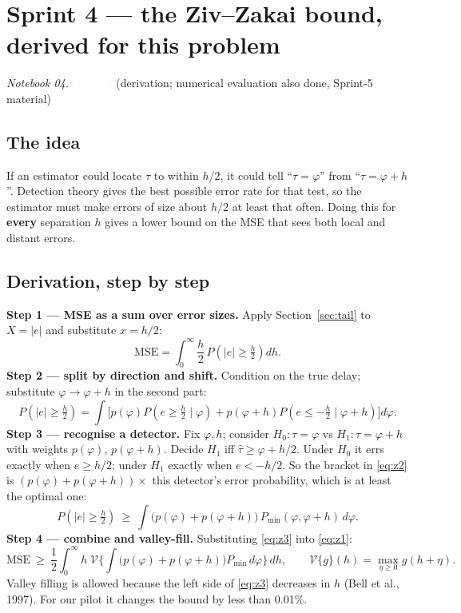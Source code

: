 \documentclass[11pt,a4paper]{article}
\newcommand{\done}{\colorbox{okgreen}{\textcolor{white}{\scriptsize\bfseries DONE}}}
\newcommand{\VF}{\mathcal{V}}
\begin{document}
\section{Sprint 4 --- the Ziv--Zakai bound, derived for this problem}\label{sec:zzb}
\textit{Notebook 04.} \done\ (derivation; numerical evaluation also done, Sprint-5 material)

\subsection{The idea}
If an estimator could locate $\tau$ to within $h/2$, it could tell ``$\tau=\varphi$'' from ``$\tau=\varphi+h$''. Detection
theory gives the best possible error rate for that test, so the estimator must make errors of size about $h/2$ at least that
often. Doing this for \textbf{every} separation $h$ gives a lower bound on the MSE that sees both local and distant errors.

\subsection{Derivation, step by step}
\textbf{Step 1 --- MSE as a sum over error sizes.} Apply Section~\ref{sec:tail} to $X=|e|$ and substitute $x=h/2$:
\begin{equation}\label{eq:z1}
\text{MSE}=\int_0^\infty\frac h2\,P\!\left(|e|\ge\tfrac h2\right)dh.
\end{equation}
\textbf{Step 2 --- split by direction and shift.} Condition on the true delay; substitute $\varphi\to\varphi+h$ in the second part:
\begin{equation}\label{eq:z2}
P(|e|\ge\tfrac h2)=\int\Big[p(\varphi)P(e\ge\tfrac h2\mid\varphi)+p(\varphi+h)P(e\le-\tfrac h2\mid\varphi+h)\Big]d\varphi.
\end{equation}
\textbf{Step 3 --- recognise a detector.} Fix $\varphi,h$; consider $H_0:\tau=\varphi$ vs $H_1:\tau=\varphi+h$ with weights
$p(\varphi)$, $p(\varphi+h)$. Decide $H_1$ iff $\hat\tau\ge\varphi+h/2$. Under $H_0$ it errs exactly when $e\ge h/2$; under $H_1$
exactly when $e<-h/2$. So the bracket in \eqref{eq:z2} is $(p(\varphi)+p(\varphi+h))\times$ this detector's error
probability, which is at least the optimal one:
\begin{equation}\label{eq:z3}
P(|e|\ge\tfrac h2)\ \ge\ \int\big(p(\varphi)+p(\varphi+h)\big)\,P_{\min}(\varphi,\varphi+h)\,d\varphi.
\end{equation}
\textbf{Step 4 --- combine and valley-fill.} Substituting \eqref{eq:z3} into \eqref{eq:z1}:
\begin{equation}
\text{MSE}\ \ge\ \frac12\int_0^\infty h\;\VF\Big\{\int\big(p(\varphi)+p(\varphi+h)\big)P_{\min}\,d\varphi\Big\}\,dh,\qquad
\VF\{g\}(h)=\max_{\eta\ge0}g(h+\eta).
\end{equation}
Valley filling is allowed because the left side of \eqref{eq:z3} decreases in $h$ (Bell et al., 1997). For our pilot it
changes the bound by less than 0.01\%.
\end{document}
